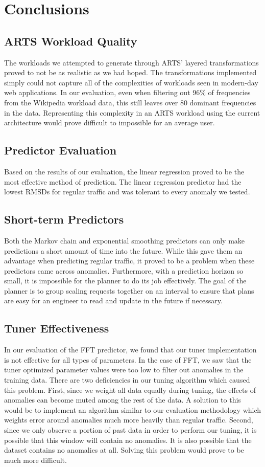 \chapter{Conclusions}
\label{ch:conclusions}

\section{ARTS Workload Quality}
The workloads we attempted to generate through ARTS' layered transformations proved to not be as realistic as we had hoped. The transformations implemented simply could not capture all of the complexities of workloads seen in modern-day web applications. In our evaluation, even when filtering out 96\% of frequencies from the Wikipedia workload data, this still leaves over 80 dominant frequencies in the data. Representing this complexity in an ARTS workload using the current architecture would prove difficult to impossible for an average user.

\section{Predictor Evaluation}
Based on the results of our evaluation, the linear regression proved to be the most effective method of prediction. The linear regression predictor had the lowest RMSDs for regular traffic and was tolerant to every anomaly we tested.

\section{Short-term Predictors}
Both the Markov chain and exponential smoothing predictors can only make predictions a short amount of time into the future. While this gave them an advantage when predicting regular traffic, it proved to be a problem when these predictors came across anomalies. Furthermore, with a prediction horizon so small, it is impossible for the \textsf{planner} to do its job effectively. The goal of the planner is to group scaling requests together on an interval to ensure that plans are easy for an engineer to read and update in the future if necessary.

\section{Tuner Effectiveness}
In our evaluation of the FFT predictor, we found that our \textsf{tuner} implementation is not effective for all types of parameters. In the case of FFT, we saw that the \textsf{tuner} optimized parameter values were too low to filter out anomalies in the training data. There are two deficiencies in our tuning algorithm which caused this problem. First, since we weight all data equally during tuning, the effects of anomalies can become muted among the rest of the data. A solution to this would be to implement an algorithm similar to our evaluation methodology which weights error around anomalies much more heavily than regular traffic. Second, since we only observe a portion of past data in order to perform our tuning, it is possible that this window will contain no anomalies. It is also possible that the dataset contains no anomalies at all. Solving this problem would prove to be much more difficult.
